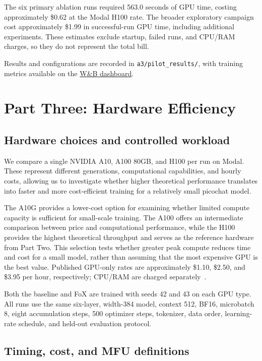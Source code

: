 \documentclass[11pt]{article}
\begin{document}
The six primary ablation runs required 563.0 seconds of
GPU time, costing approximately \$0.62 at the Modal H100
rate. The broader exploratory campaign cost approximately
\$1.99 in successful-run GPU time, including additional
experiments. These estimates exclude startup, failed runs,
and CPU/RAM charges, so they do not represent the total bill.

Results and configurations are recorded in
\texttt{a3/pilot\_results/}, with training metrics
available on the
\href{https://wandb.ai/jinhaozhang123-university-of-toronto/a3-picochat-pilot}
{W\&B dashboard}.

\clearpage
\section{Part Three: Hardware Efficiency}
\subsection{Hardware choices and controlled workload}
We compare a single NVIDIA A10, A100 80GB, and H100 per run on Modal.
These represent different generations,
computational capabilities, and hourly costs, allowing
us to investigate whether higher theoretical performance
translates into faster and more cost-efficient training
for a relatively small picochat model.

The A10G provides a lower-cost option for examining whether
limited compute capacity is sufficient for small-scale
training. The A100 offers an intermediate comparison
between price and computational performance, while the
H100 provides the highest theoretical throughput and
serves as the reference hardware from Part Two.
This selection tests
whether greater peak compute reduces time and cost for a small model,
rather than assuming that the most expensive GPU is the best value.
Published GPU-only rates are approximately \$1.10, \$2.50, and \$3.95
per hour, respectively; CPU/RAM are charged separately~\cite{modal-pricing}.

Both the baseline and FoX are trained with seeds 42 and 43
on each GPU type. All runs
use the same six-layer, width-384 model, context 512, BF16, microbatch 8,
eight accumulation steps, 500 optimizer steps, tokenizer, data order,
learning-rate schedule, and held-out evaluation protocol.

\subsection{Timing, cost, and MFU definitions}
\end{document}
